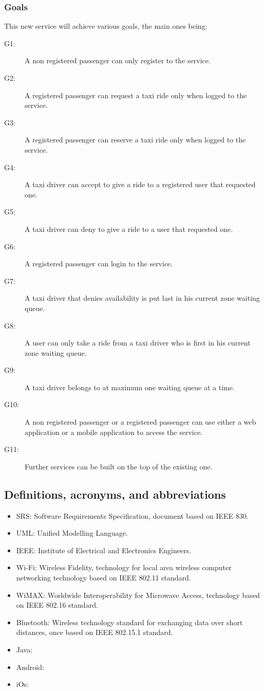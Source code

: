 \subsubsection{Goals}
This new service will achieve various goals, the main ones being:
\begin{description}
	\item[G1:] A non registered passenger can only register to the service.
	\item[G2:] A registered passenger can request a taxi ride only when logged to the service.
	\item[G3:] A registered passenger can reserve a taxi ride only when logged to the service.
	\item[G4:] A taxi driver can accept to give a ride to a registered user that requested one.
	\item[G5:] A taxi driver can deny to give a ride to a user that requested one.
	\item[G6:] A registered passenger can login to the service.
	\item[G7:] A taxi driver that denies availability is put last in his current zone waiting queue.
	\item[G8:] A user can only take a ride from a taxi driver who is first in his current zone waiting queue.
	\item[G9:] A taxi driver belongs to at maximum one waiting queue at a time.
	\item[G10:] A non registered passenger or a registered passenger can use either a web application or a mobile application to access the service.
	\item[G11:] Further services can be built on the top of the existing one.
\end{description}
\subsection{Definitions, acronyms, and abbreviations}
\begin{itemize}
	\item SRS: Software Requirements Specification, document based on IEEE 830.
	\item UML: Unified Modelling Language.
	\item IEEE: Institute of Electrical and Electronics Engineers.
	\item Wi-Fi: Wireless Fidelity, technology for local area wireless computer networking technology based on IEEE 802.11 standard.
	\item WiMAX: Worldwide Interoperability for Microwave Access, technology based on IEEE 802.16 standard.
	\item Bluetooth: Wireless technology standard for exchanging data over short distances, once based on IEEE 802.15.1 standard.
	\item Java:
	\item Android:
	\item iOs:
\end{itemize}
